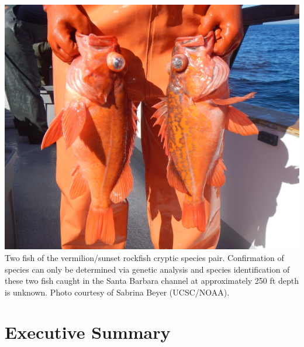 \documentclass[11pt,
  english,
]{article}
\begin{document}
\pagestyle{plain}  %
\renewcommand*{\thefootnote}{\arabic{footnote}}  %
\setcounter{footnote}{0}  %
\renewcommand{\headrulewidth}{0.5pt}
\renewcommand{\footrulewidth}{0.5pt}

\newcommand{\lt}{\ensuremath <}
\newcommand{\gt}{\ensuremath >}

\newcommand\CapeM{$40^\circ 10^\prime N$}
\newcommand\PtC{$34^\circ 27^\prime N$}
\newcommand\CAOR{$42^\circ 00^\prime N$}

\newpage

\includegraphics{cover_photo.png} Two fish of the vermilion/sunset rockfish cryptic species pair. Confirmation of species can only be determined via genetic analysis and species identification of these two fish caught in the Santa Barbara channel at approximately 250 ft depth is unknown. Photo courtesy of Sabrina Beyer (UCSC/NOAA).

\pagebreak
{}
\setcounter{page}{1}

\renewcommand{\thetable}{\roman{table}}
\renewcommand{\thefigure}{\roman{figure}}

\setlength\parskip{0.5em plus 0.1em minus 0.2em}


\hypertarget{executive-summary}{%
\section*{Executive Summary}\label{executive-summary}}
\end{document}
